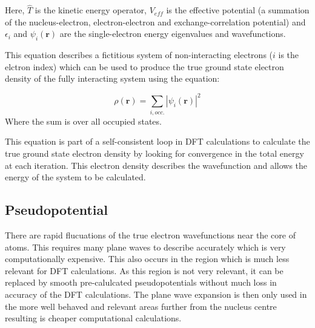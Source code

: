 \documentclass[12pt]{article}
\begin{document}
		\bigskip
		
		\noindent Here, $\hat{T}$ is the kinetic energy operator, $V_{eff}$ is the effective potential (a summation of the nucleus-electron, electron-electron and exchange-correlation potential) and $\epsilon_i$ and $\psi_i(\textbf{r})$ are the single-electron energy eigenvalues and wavefunctions.
		
		\bigskip
		
		\noindent This equation describes a fictitious system of non-interacting electrons ($i$ is the elctron index) which can be used to produce the true ground state electron density of the fully interacting system using the equation:
		
		\begin{equation}
		\rho(\textbf{r}) = \sum_{i, occ.}^{}|\psi_i(\textbf{r})|^2
		\end{equation}
		Where the sum is over all occupied states.
	
		\bigskip
		
		\noindent This equation is part of a self-consistent loop in DFT calculations to calculate the true ground state electron density by looking for convergence in the total energy at each iteration. This electron density describes the wavefunction and allows the energy of the system to be calculated.

		\subsection*{Pseudopotential}
		There are rapid flucuations of the true electron wavefunctions near the core of atoms. This requires many plane waves to describe accurately which is very computationally expensive. This also occurs in the region which is much less relevant for DFT calculations. As this region is not very relevant, it can be replaced by smooth pre-calulcated pseudopotentials without much loss in accuracy of the DFT calculations. The plane wave expansion is then only used in the more well behaved and relevant areas further from the nucleus centre resulting is cheaper computational calculations.
		
	
\end{document}
